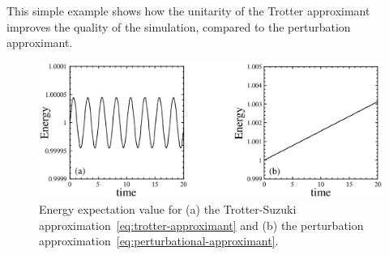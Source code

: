 This simple example shows how the unitarity of the Trotter approximant improves the quality of the simulation, compared to the perturbation approximant.

\begin{figure}
  \centering
   \includegraphics[width=12cm]{Plots/spin_evolution.eps}
   \caption{Energy expectation value for (a) the Trotter-Suzuki approximation~\eqref{eq:trotter-approximant} and (b) the perturbation approximation~\eqref{eq:perturbational-approximant}.} \label{plot:spin-evolution}
\end{figure}